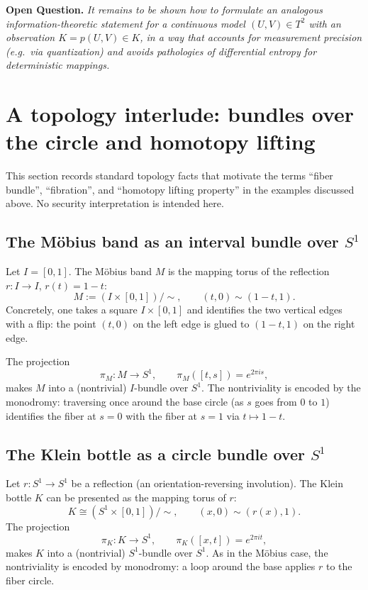 \documentclass[11pt,a4paper]{article}
\theoremstyle{definition}
\theoremstyle{remark}
\newenvironment{openquestion}{\par\textbf{Open Question.}\itshape}{\par}
\begin{document}
\begin{openquestion}
\label{oq:continuous-info}
It remains to be shown how to formulate an analogous information-theoretic statement for a continuous model \((U,V)\in T^2\) with an observation \(K=p(U,V)\in K\), in a way that accounts for measurement precision (e.g.\ via quantization) and avoids pathologies of differential entropy for deterministic mappings.
\end{openquestion}

\section{A topology interlude: bundles over the circle and homotopy lifting}
\label{sec:topology}

This section records standard topology facts that motivate the terms ``fiber bundle'', ``fibration'', and ``homotopy lifting property'' in the examples discussed above. No security interpretation is intended here.

\subsection{The Möbius band as an interval bundle over \(S^1\)}
\label{sec:mobius-to-circle}

Let \(I=[0,1]\). The Möbius band \(M\) is the mapping torus of the reflection \(r:I\to I\), \(r(t)=1-t\):
\[
M := (I\times [0,1])/\!\sim,
\qquad
(t,0)\sim(1-t,1).
\]
Concretely, one takes a square \(I\times[0,1]\) and identifies the two vertical edges with a flip: the point \((t,0)\) on the left edge is glued to \((1-t,1)\) on the right edge.

The projection
\[
\pi_M:M\to S^1,\qquad \pi_M([t,s])=e^{2\pi i s},
\]
makes \(M\) into a (nontrivial) \(I\)-bundle over \(S^1\). The nontriviality is encoded by the monodromy: traversing once around the base circle (as \(s\) goes from \(0\) to \(1\)) identifies the fiber at \(s=0\) with the fiber at \(s=1\) via \(t\mapsto 1-t\).

\subsection{The Klein bottle as a circle bundle over \(S^1\)}
\label{sec:klein-to-circle}

Let \(r:S^1\to S^1\) be a reflection (an orientation-reversing involution). The Klein bottle \(K\) can be presented as the mapping torus of \(r\):
\[
K \cong (S^1\times[0,1])/\!\sim,
\qquad
(x,0)\sim(r(x),1).
\]
The projection
\[
\pi_K:K\to S^1,\qquad \pi_K([x,t]) = e^{2\pi i t},
\]
makes \(K\) into a (nontrivial) \(S^1\)-bundle over \(S^1\). As in the Möbius case, the nontriviality is encoded by monodromy: a loop around the base applies \(r\) to the fiber circle.
\end{document}

